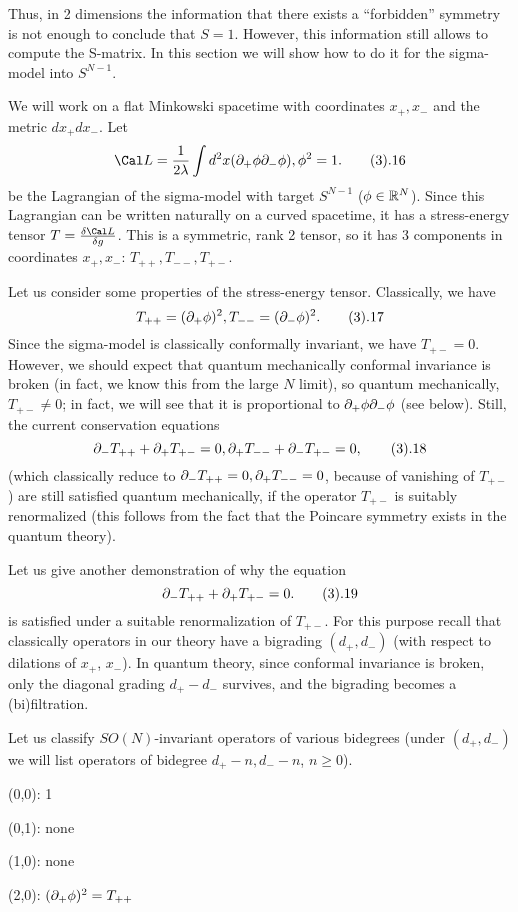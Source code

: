 Thus, in 2 dimensions the information that there exists a ``forbidden''
symmetry is not enough to conclude that $S=1$. However, 
this information still allows to compute the S-matrix. In this section we will
show how to do it for the sigma-model into $S^{N-1}$. 

We will work on a flat Minkowski spacetime with coordinates 
$x_+,x_-$ and the metric $dx_+dx_-$. Let 
$$
\Cal L=\frac{1}{2\l}\int d^2x(\d_+\phi\d_-\phi), \phi^2=1.\tag 3.16
$$ 
be the Lagrangian of
the sigma-model with target $S^{N-1}$ ($\phi\in\Bbb R^N$). 
Since this Lagrangian can be written naturally on a curved spacetime,
it has a stress-energy tensor $T=\frac{\delta \Cal L}{\delta g}$. 
This is a symmetric, rank 2 tensor, so it has 3 components in coordinates 
$x_+,x_-$: $T_{++},T_{--},T_{+-}$.  

Let us consider some properties of the stress-energy tensor. 
Classically, we have 
$$
T_{++}=(\d_+\phi)^2, T_{--}=(\d_-\phi)^2.\tag 3.17
$$
Since the sigma-model is classically conformally invariant, 
we have $T_{+-}=0$. However, 
we should expect that quantum mechanically 
conformal invariance is broken (in fact, we know this from the large $N$ 
limit), so quantum mechanically, $T_{+-}\ne 0$; in fact, we will  
see that it is proportional to 
$\partial_+\phi\partial_-\phi$ (see below). Still, the
current conservation equations 
$$
\d_-T_{++}+\d_+T_{+-}=0, \d_+T_{--}+\d_-T_{+-}=0,\tag 3.18
$$
(which classically reduce to $\partial_-T_{++}=0, \partial_+T_{--}=0$, because
of vanishing of $T_{+-}$) are still satisfied quantum mechanically, 
if the operator $T_{+-}$ is suitably renormalized (this follows from the fact 
that the Poincare symmetry exists in the quantum theory). 

Let us give another demonstration of why the equation
$$
\d_-T_{++}+\d_+T_{+-}=0.\tag 3.19
$$ 
is satisfied under a suitable renormalization 
of $T_{+-}$. For this purpose recall that classically operators 
in our theory have a bigrading $(d_+,d_-)$ (with respect to 
dilations of $x_+$, $x_-$). In quantum theory, 
since conformal invariance is broken, 
only the diagonal grading $d_+-d_-$ survives, and the 
bigrading becomes a (bi)filtration. 

Let us classify $SO(N)$-invariant  operators of various bidegrees
(under $(d_+,d_-)$ we will list operators of bidegree $d_+-n,d_--n$, 
$n\ge 0$). 

(0,0): 1

(0,1): none

(1,0): none 

(2,0): $(\partial_+\phi)^2=T_{++}$

